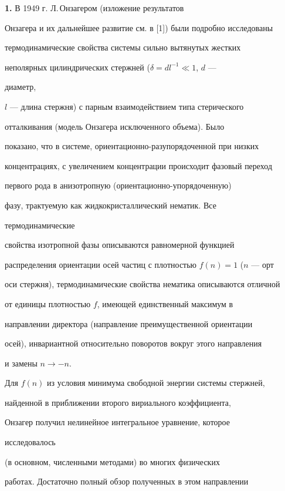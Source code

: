 \label{begin} 


 


{\bf 1.} В 1949 г. Л.\,Онзагером (изложение результатов 


Онзагера и их дальнейшее развитие см. в [1]) были подробно исследованы 


термодинамические свойства системы сильно вытянутых жестких 


неполярных цилиндрических стержней ($\delta=dl^{-1}\ll 1$, $d$ --- 


диаметр, 


$l$ --- длина стержня) с парным взаимодействием типа стерического 


отталкивания (модель Онзагера исключенного объема). Было  


показано, что в системе, ориентационно-разупорядоченной при низких 


концентрациях, с увеличением концентрации происходит фазовый переход 


первого рода в анизотропную (ориентационно-упорядоченную)  


фазу, трактуемую как жидкокристаллический нематик. Все 


термодинамические 


свойства изотропной фазы описываются равномерной функцией 


распределения ориентации осей частиц с плотностью $f(n)=1$ ($n$ --- орт 


оси стержня), термодинамические свойства нематика описываются отличной 


от единицы плотностью $f$, имеющей единственный максимум в  


направлении директора (направление преимущественной ориентации 


осей), инвариантной относительно поворотов вокруг этого направления 


и замены $n\to -n$. 


 


Для $f(n)$ из условия минимума свободной энергии системы стержней, 


найденной в приближении второго вириального коэффициента,  


Онзагер получил нелинейное интегральное уравнение, которое 


исследовалось 


(в основном, численными методами) во многих физических  


работах. Достаточно полный обзор полученных в этом направлении  


